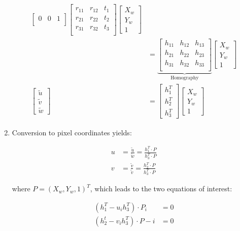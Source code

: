 \documentclass[10pt,a4paper]{scrartcl}
\begin{document}
\begin{multicols*}{2}
\begin{enumerate}
\begin{align*}
\begin{bmatrix}
0&0&1\\
\end{bmatrix}
\begin{bmatrix}
r_{11}&r_{12}&t_1\\
r_{21}&r_{22}&t_2\\
r_{31}&r_{32}&t_3\\
\end{bmatrix}\begin{bmatrix}
X_w\\Y_w\\1
\end{bmatrix}\\
&=\underbrace{\begin{bmatrix}
h_{11}&h_{12}&h_{13}\\
h_{21}&h_{22}&h_{23}\\
h_{31}&h_{32}&h_{33}\\
\end{bmatrix}}_{\text{Homography}}\begin{bmatrix}
X_w\\Y_w\\1
\end{bmatrix}\\
\begin{bmatrix}
\tilde{u}\\\tilde{v}\\\tilde{w}
\end{bmatrix}&=\begin{bmatrix}
h_1^T\\h_2^T\\h_3^T
\end{bmatrix}
\begin{bmatrix}
X_w\\Y_w\\1
\end{bmatrix}
\end{align*}

\item Conversion to pixel coordinates yields:

\begin{align*}
u&=\frac{\tilde{u}}{\tilde{w}}=\frac{h_1^T\cdot P}{h_3^T\cdot P}\\
v&=\frac{\tilde{v}}{\tilde{v}}=\frac{h_2^T\cdot P}{h_3^T\cdot P}
\end{align*}

where $P=(X_w,Y_w,1)^T$, which leads to the two equations of interest:

\begin{align*}
(h_1^T-u_ih_3^T)\cdot P_i&=0\\
(h_2^t-v_ih_3^T)\cdot P-i&=0
\end{align*}


\end{enumerate}
\end{multicols*}
\end{document}
